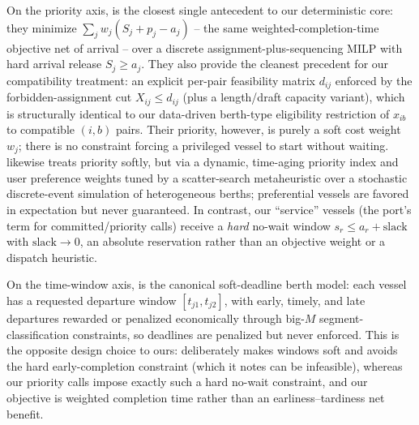 On the priority axis, \citet{alzaabi2016berth} is the closest single antecedent
to our deterministic core: they minimize $\sum_j w_j (S_j + p_j - a_j)$ -- the
same weighted-completion-time objective net of arrival -- over a discrete
assignment-plus-sequencing MILP with hard arrival release $S_j \ge a_j$. They
also provide the cleanest precedent for our compatibility treatment: an explicit
per-pair feasibility matrix $d_{ij}$ enforced by the forbidden-assignment cut
$X_{ij} \le d_{ij}$ (plus a length/draft capacity variant), which is
structurally identical to our data-driven berth-type eligibility restriction of
$x_{ib}$ to compatible $(i,b)$ pairs. Their priority, however, is purely a soft
cost weight $w_j$; there is no constraint forcing a privileged vessel to start
without waiting. \citet{Ursavas2022PriorityControlBAP} likewise treats priority
softly, but via a dynamic, time-aging priority index and user preference weights
tuned by a scatter-search metaheuristic over a stochastic discrete-event
simulation of heterogeneous berths; preferential vessels are favored in
expectation but never guaranteed. In contrast, our ``service'' vessels (the
port's term for committed/priority calls) receive a \emph{hard} no-wait window
$s_r \le a_r + \mathrm{slack}$ with $\mathrm{slack}\!\to\!0$, an absolute
reservation rather than an objective weight or a dispatch heuristic.

On the time-window axis, \citet{golias2007berth} is the canonical soft-deadline
berth model: each vessel has a requested departure window $[t_{j1}, t_{j2}]$,
with early, timely, and late departures rewarded or penalized economically
through big-$M$ segment-classification constraints, so deadlines are penalized
but never enforced. This is the opposite design choice to ours:
\citet{golias2007berth} deliberately makes windows soft and avoids the hard
early-completion constraint (which it notes can be infeasible), whereas our
priority calls impose exactly such a hard no-wait constraint, and our objective
is weighted completion time rather than an earliness--tardiness net benefit.

